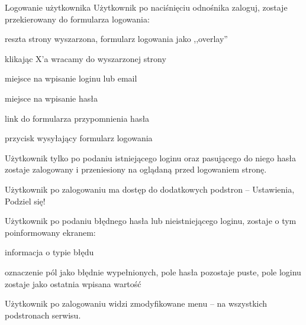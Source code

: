 \begin{userstory}{Logowanie użytkownika}
    Użytkownik po naciśnięciu odnośnika zaloguj,
    zostaje przekierowany do formularza logowania:
    \begin{packed_enum}
        \item reszta strony wyszarzona, formularz logowania jako ,,overlay''
        \item klikając X'a wracamy do wyszarzonej strony
        \item miejsce na wpisanie loginu lub email
        \item miejsce na wpisanie hasła
        \item link do formularza przypomnienia hasła
        \item przycisk wysyłający formularz logowania
    \end{packed_enum}
    
    \begin{tests}
        \item{
            Użytkownik tylko po podaniu istniejącego loginu oraz pasującego do niego hasła
            zostaje zalogowany i przeniesiony na oglądaną przed logowaniem stronę.
        }
        \item{
            Użytkownik po zalogowaniu ma dostęp do dodatkowych podstron -- Ustawienia, Podziel się!
        }
        \item{
            Użytkownik po podaniu błędnego hasła lub nieistniejącego loginu, zostaje o tym poinformowany ekranem:
            \begin{packed_enum}
                \item informacja o typie błędu
                \item oznaczenie pól jako błędnie wypełnionych, pole hasła pozostaje puste, pole loginu zostaje jako ostatnia wpisana wartość
            \end{packed_enum}
        }
        \item{Użytkownik po zalogowaniu widzi zmodyfikowane menu -- na wszystkich podstronach serwisu.}
    \end{tests}
\end{userstory}

